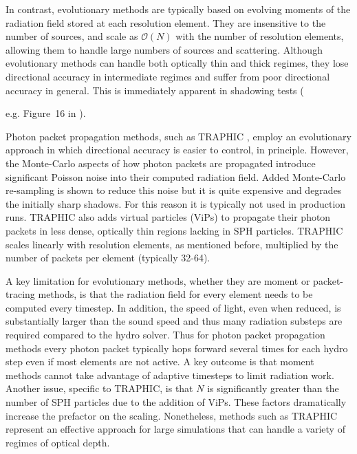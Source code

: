 \documentclass[fleq,usenatbib]{mnras}
\begin{document}
In contrast, evolutionary methods are typically based on evolving moments of 
the radiation field stored at each resolution element. They are insensitive to 
the number of sources, and scale as $\mathcal{O}(N)$ with the number of 
resolution elements, allowing them to handle large numbers of sources and 
scattering. Although evolutionary methods can handle both optically thin and 
thick regimes, they lose directional accuracy in intermediate regimes and 
suffer from poor directional accuracy in general. This is immediately apparent 
in shadowing tests ({e.g. Figure~16 in \citealt{rosdahlEt13}).

Photon packet propagation methods, such as TRAPHIC \citep{pawlikSchaye08}, 
employ an evolutionary approach in which directional accuracy is easier to 
control, in principle. However, the Monte-Carlo aspects of how photon packets 
are propagated introduce significant Poisson noise into their computed 
radiation field. Added Monte-Carlo re-sampling is shown to reduce this noise 
but it is quite expensive and degrades the initially sharp shadows. For this 
reason  it is typically not used in production runs. TRAPHIC also adds virtual 
particles (ViPs) to propagate their photon packets in less dense, optically 
thin regions lacking in SPH particles. TRAPHIC scales linearly with resolution 
elements, as mentioned before, multiplied by the number of packets per element 
(typically 32-64).

A key limitation for evolutionary methods, whether they are moment or 
packet-tracing methods, is that the radiation field for every element needs to 
be computed every timestep. In addition, the speed of light, even when 
reduced, is substantially larger than the sound speed and thus many radiation 
substeps are required compared to the hydro solver. Thus for photon packet 
propagation methods every photon packet typically hops forward several times 
for each hydro step even if most elements are not active. A key outcome is 
that moment methods cannot take advantage of adaptive timesteps to limit 
radiation work.  Another issue, specific to TRAPHIC, is that $N$ is 
significantly greater than the number of SPH particles due to the addition of 
ViPs. These factors dramatically increase the prefactor on the scaling.  
Nonetheless, methods such as TRAPHIC represent an effective approach for large 
simulations that can handle a variety of regimes of optical depth.

}
\end{document}
